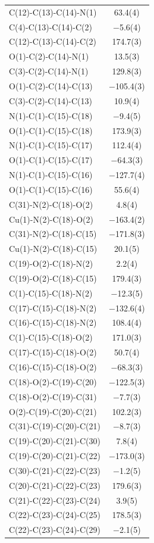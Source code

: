 \begin{center}
{\begin{supertabular}{p{1.8in}c}
C(12)-C(13)-C(14)-N(1)&63.4(4)\\
C(4)-C(13)-C(14)-C(2)&$-$5.6(4)\\
C(12)-C(13)-C(14)-C(2)&174.7(3)\\
O(1)-C(2)-C(14)-N(1)&13.5(3)\\
C(3)-C(2)-C(14)-N(1)&129.8(3)\\
O(1)-C(2)-C(14)-C(13)&$-$105.4(3)\\
C(3)-C(2)-C(14)-C(13)&10.9(4)\\
N(1)-C(1)-C(15)-C(18)&$-$9.4(5)\\
O(1)-C(1)-C(15)-C(18)&173.9(3)\\
N(1)-C(1)-C(15)-C(17)&112.4(4)\\
O(1)-C(1)-C(15)-C(17)&$-$64.3(3)\\
N(1)-C(1)-C(15)-C(16)&$-$127.7(4)\\
O(1)-C(1)-C(15)-C(16)&55.6(4)\\
C(31)-N(2)-C(18)-O(2)&4.8(4)\\
Cu(1)-N(2)-C(18)-O(2)&$-$163.4(2)\\
C(31)-N(2)-C(18)-C(15)&$-$171.8(3)\\
Cu(1)-N(2)-C(18)-C(15)&20.1(5)\\
C(19)-O(2)-C(18)-N(2)&2.2(4)\\
C(19)-O(2)-C(18)-C(15)&179.4(3)\\
C(1)-C(15)-C(18)-N(2)&$-$12.3(5)\\
C(17)-C(15)-C(18)-N(2)&$-$132.6(4)\\
C(16)-C(15)-C(18)-N(2)&108.4(4)\\
C(1)-C(15)-C(18)-O(2)&171.0(3)\\
C(17)-C(15)-C(18)-O(2)&50.7(4)\\
C(16)-C(15)-C(18)-O(2)&$-$68.3(3)\\
C(18)-O(2)-C(19)-C(20)&$-$122.5(3)\\
C(18)-O(2)-C(19)-C(31)&$-$7.7(3)\\
O(2)-C(19)-C(20)-C(21)&102.2(3)\\
C(31)-C(19)-C(20)-C(21)&$-$8.7(3)\\
C(19)-C(20)-C(21)-C(30)&7.8(4)\\
C(19)-C(20)-C(21)-C(22)&$-$173.0(3)\\
C(30)-C(21)-C(22)-C(23)&$-$1.2(5)\\
C(20)-C(21)-C(22)-C(23)&179.6(3)\\
C(21)-C(22)-C(23)-C(24)&3.9(5)\\
C(22)-C(23)-C(24)-C(25)&178.5(3)\\
C(22)-C(23)-C(24)-C(29)&$-$2.1(5)\\

\end{supertabular}}
\end{center}
